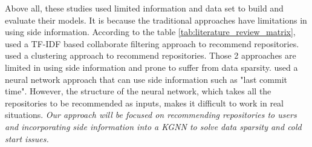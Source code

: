 \documentclass[11pt,twoside]{report}
\begin{document}
Above all, these studies used limited information and data set to build and evaluate their models. It is because the traditional approaches have limitations in using side information. According to the table \ref{tab:literature_review_matrix}, \cite{xu_repersp_2017,inka_open_2018,sun_personalized_2018,zhang_detecting_2017} used a TF-IDF based collaborate filtering approach to recommend repositories. \cite{guendouz_recommending_2015} used a clustering approach to recommend repositories. Those 2 approaches are limited in using side information and prone to suffer from data sparsity. \cite{liu_recommending_2018} used a neural network approach that can use side information such as "last commit time". However, the structure of the neural network, which takes all the repositories to be recommended as inputs, makes it difficult to work in real situations. \textit{Our approach will be focused on recommending repositories to users and incorporating side information into a KGNN to solve data sparsity and cold start issues.}
\end{document}
